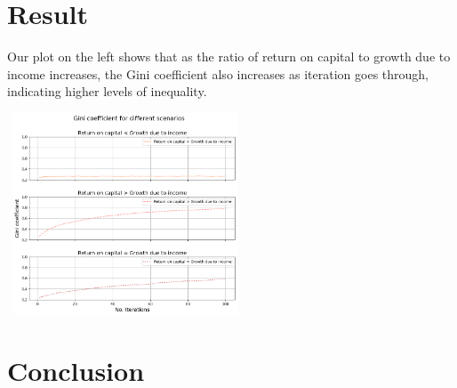 \documentclass{article}
\begin{document}
\section*{Result}
\vspace{-0.3cm}

Our plot on the left shows that as the ratio of return on capital to growth due to income increases, 
the Gini coefficient also increases as iteration goes through, indicating higher levels of inequality. 

\vspace{0.3cm}
\includegraphics[width=7cm,height=6cm]{ratio_comparison.png}

\vspace{-0.4cm}
\section*{Conclusion}
\end{document}
